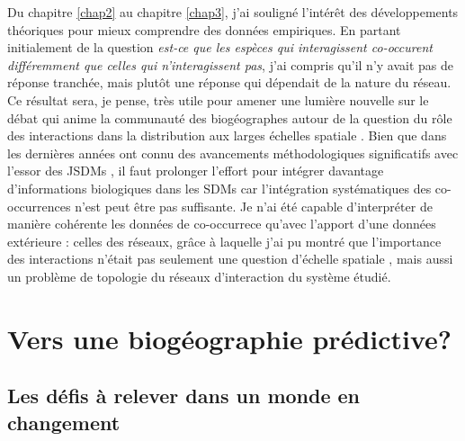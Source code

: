 Du chapitre \ref{chap2} au chapitre \ref{chap3}, j'ai souligné l'intérêt
des développements théoriques pour mieux comprendre des données
empiriques. En partant initialement de la question \emph{est-ce que les
espèces qui interagissent co-occurent différemment que celles qui
n'interagissent pas}, j'ai compris qu'il n'y avait pas de réponse
tranchée, mais plutôt une réponse qui dépendait de la nature du réseau.
Ce résultat sera, je pense, très utile pour amener une lumière nouvelle
sur le débat qui anime la communauté des biogéographes autour de la
question du rôle des interactions dans la distribution aux larges
échelles spatiale \citep{Araujo2014, Godsoe2015}. Bien que dans les
dernières années ont connu des avancements méthodologiques significatifs
avec l'essor des JSDMs \citep{Ovaskainen2010, Pollock2014, Warton2015b},
il faut prolonger l'effort pour intégrer davantage d'informations
biologiques dans les SDMs car l'intégration systématiques des
co-occurrences n'est peut être pas suffisante. Je n'ai été capable
d'interpréter de manière cohérente les données de co-occurrece qu'avec
l'apport d'une données extérieure : celles des réseaux, grâce à laquelle
j'ai pu montré que l'importance des interactions n'était pas seulement
une question d'échelle spatiale \citep{Araujo2014, Belmaker2015}, mais
aussi un problème de topologie du réseaux d'interaction du système
étudié.

\section*{Vers une biogéographie
prédictive?}\label{vers-une-bioguxe9ographie-pruxe9dictive}

\subsection*{Les défis à relever dans un monde en
changement}\label{les-duxe9fis-uxe0-relever-dans-un-monde-en-changement}


